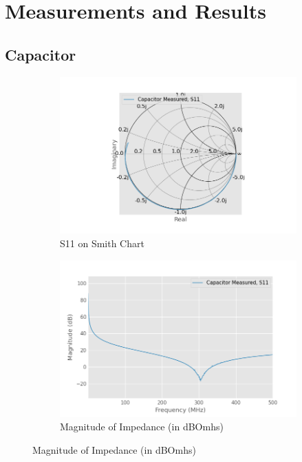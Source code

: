 \documentclass{article}
\begin{document}
\section{Measurements and Results}

\subsection{Capacitor}
\begin{figure}[h]
    \centering
    \begin{subfigure}{0.5\linewidth}
        \includegraphics[width=\linewidth]{./pics/capacitor_meas_smith.png}
        \caption{S11 on Smith Chart}
    \end{subfigure}%
    \begin{subfigure}{0.5\linewidth}
        \includegraphics[width=\linewidth]{./pics/capacitor_meas_db.png}
        \caption{Magnitude of Impedance (in dBOmhs)}
    \end{subfigure}


\end{figure}
\end{document}
